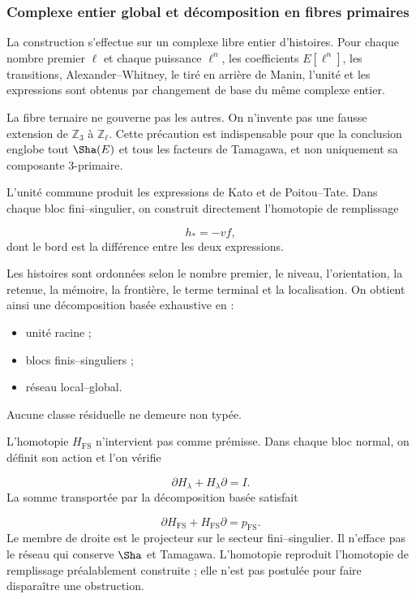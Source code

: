 \subsubsection{Complexe entier global et décomposition en fibres primaires}
La construction s’effectue sur un complexe libre entier d’histoires. Pour chaque nombre premier \(\ell\) et chaque puissance \(\ell^n\), les coefficients \(E[\ell^n]\), les transitions, Alexander–Whitney, le tiré en arrière de Manin, l’unité et les expressions sont obtenus par changement de base du même complexe entier.\par
La fibre ternaire ne gouverne pas les autres. On n’invente pas une fausse extension de \(\mathbb Z_3\) à \(\mathbb Z_\ell\). Cette précaution est indispensable pour que la conclusion englobe tout \(\Sha(E)\) et tous les facteurs de Tamagawa, et non uniquement sa composante \(3\)-primaire.\par
L’unité commune produit les expressions de Kato et de Poitou–Tate. Dans chaque bloc fini–singulier, on construit directement l’homotopie de remplissage\par
\[
h_*=-vf,
\]
dont le bord est la différence entre les deux expressions.\par
Les histoires sont ordonnées selon le nombre premier, le niveau, l’orientation, la retenue, la mémoire, la frontière, le terme terminal et la localisation. On obtient ainsi une décomposition basée exhaustive en :\par
\begin{itemize}
\item unité racine ;
\item blocs finis–singuliers ;
\item réseau local–global.
\end{itemize}
Aucune classe résiduelle ne demeure non typée.\par
L’homotopie \(H_{\mathrm{FS}}\) n’intervient pas comme prémisse. Dans chaque bloc normal, on définit son action et l’on vérifie\par
\[
\partial H_\lambda+H_\lambda\partial=I.
\]
La somme transportée par la décomposition basée satisfait\par
\[
\partial H_{\mathrm{FS}}
+
H_{\mathrm{FS}}\partial
=
p_{\mathrm{FS}}.
\]
Le membre de droite est le projecteur sur le secteur fini–singulier. Il n’efface pas le réseau qui conserve \(\Sha\) et Tamagawa. L’homotopie reproduit l’homotopie de remplissage préalablement construite ; elle n’est pas postulée pour faire disparaître une obstruction.\par
{}
